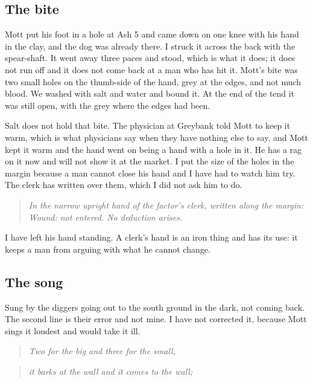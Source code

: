 \documentclass{design/chronicle}
\begin{document}
\subsection*{The bite}

Mott put his foot in a hole at Ash 5 and came down on one knee with his hand in the clay, and the dog was already there. I struck it across the back with the spear-shaft. It went away three paces and stood, which is what it does; it does not run off and it does not come back at a man who has hit it. Mott’s bite was two small holes on the thumb-side of the hand, grey at the edges, and not much blood. We washed with salt and water and bound it. At the end of the tend it was still open, with the grey where the edges had been.

Salt does not hold that bite. The physician at Greybank told Mott to keep it warm, which is what physicians say when they have nothing else to say, and Mott kept it warm and the hand went on being a hand with a hole in it. He has a rag on it now and will not show it at the market. I put the size of the holes in the margin because a man cannot close his hand and I have had to watch him try. The clerk has written over them, which I did not ask him to do.

\begin{quote}\itshape \emph{In the narrow upright hand of the factor’s clerk, written along the margin:} Wound: not entered. No deduction arises.\end{quote}

I have left his hand standing. A clerk’s hand is an iron thing and has its use: it keeps a man from arguing with what he cannot change.

\subsection*{The song}

Sung by the diggers going out to the south ground in the dark, not coming back. The second line is their error and not mine. I have not corrected it, because Mott sings it loudest and would take it ill.

\begin{quote}\itshape Two for the big and three for the small,\end{quote}

\begin{quote}\itshape it barks at the wall and it comes to the wall;\end{quote}
\end{document}
